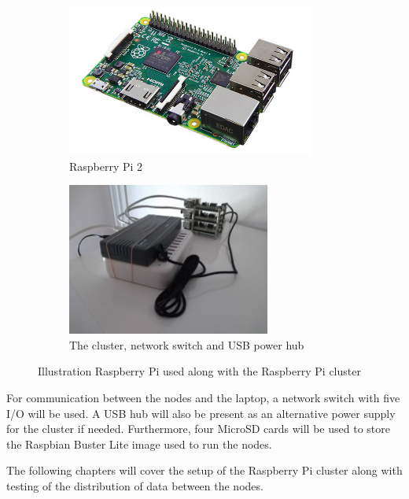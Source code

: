 \documentclass[../Head/Report.tex]{subfiles}
\begin{document}
\begin{figure}[H]
\centering
  \begin{subfigure}[b]{0.48\textwidth}
  \centering
    \includegraphics[height=5cm]{../Figures/raspberry_pi.png}
    \caption{Raspberry Pi 2}
    \label{fig:raspberry_pi}
  \end{subfigure}
  \hfill
  \begin{subfigure}[b]{0.48\textwidth}
  \centering
    \includegraphics[height=5cm]{../Figures/cluster.jpg}
    \caption{The cluster, network switch and USB power hub}
    \label{fig:cluster}
  \end{subfigure}
  \caption{Illustration Raspberry Pi used along with the Raspberry Pi cluster }
\end{figure}
    
For communication between the nodes and the laptop, a network switch with five I/O will be used. A USB hub will also be present as an alternative power supply for the cluster if needed. Furthermore, four MicroSD cards will be used to store the Raspbian Buster Lite image used to run the nodes.  

The following chapters will cover the setup of the Raspberry Pi cluster along with testing of the distribution of data between the nodes.   
\end{document}
